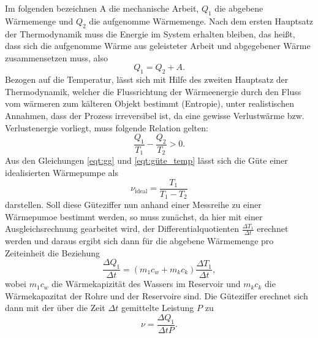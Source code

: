     Im folgenden bezeichnen A die mechanische Arbeit, $Q_1$ die abgebene Wärmemenge und $Q_2$ die aufgenomme Wärmemenge. 
    Nach dem ersten Hauptsatz der Thermodynamik muss die Energie im System erhalten bleiben, das heißt, dass sich die aufgenomme Wärme aus geleisteter Arbeit und abgegebener Wärme zusammensetzen muss, also
    \begin{equation}
      \label{eqt:gg}
      Q_1 = Q_2 + A .
    \end{equation}
    Bezogen auf die Temperatur, lässt sich mit Hilfe des zweiten Hauptsatz der Thermodynamik, welcher die Flussrichtung der Wärmeenergie durch den Fluss vom wärmeren zum kälteren Objekt bestimmt (Entropie), unter realistischen Annahmen,
    dass der Prozess irreversibel ist, da eine gewisse Verlustwärme bzw. Verlustenergie vorliegt,  
    muss folgende Relation gelten:
    \begin{equation}
      \label{eqt:güte_temp}
      \frac{Q_1}{T_1} - \frac{Q_2}{T_2} > 0 .
    \end{equation}
    Aus den Gleichungen \eqref{eqt:gg} und \eqref{eqt:güte_temp} lässt sich die Güte einer idealisierten Wärmepumpe als
    \begin{equation}
      \label{eqt:Güte}
      \nu_\text{ideal} = \frac {T_1}{T_1 - T_2}
    \end{equation}
    darstellen.
    Soll diese Güteziffer nun anhand einer Messreihe zu einer Wärmepumoe bestimmt werden, so muss zunächst, da hier mit einer Ausgleichsrechnung gearbeitet wird, der Differentialquotienten $\frac{\Delta T_1}{\Delta t }$
    erechnet werden und daraus ergibt sich dann für die abgebene Wärmemenge pro Zeiteinheit die Beziehung
    \begin{equation}
      \label{eqt:wärme_zeit}
      \frac{\Delta Q_1} {\Delta t} = (m_1 c_w + m_k c_k) \frac {\Delta T_1}{\Delta t},
    \end{equation}
    wobei $m_1 c_w$ die Wärmekapizität des Wassers im Reservoir und $m_k c_k$ die Wärmekapazitat der Rohre und der Reservoire sind.
    Die Güteziffer erechnet sich dann mit der über die Zeit $\Delta t$ gemittelte Leistung $P$ zu
    \begin{equation}
      \label{eqt:güte}
      \nu = \frac {\Delta Q_1}{\Delta t P}.
    \end{equation}
